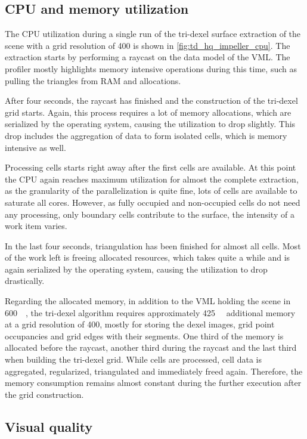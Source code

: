 \subsection{CPU and memory utilization}
\label{sec:tri_dexel_utilization}

The CPU utilization during a single run of the tri-dexel surface extraction of the \impeller scene with a grid resolution of 400 is shown in \cref{fig:td_hq_impeller_cpu}.
The extraction starts by performing a raycast on the data model of the VML.
The profiler mostly highlights memory intensive operations during this time, such as pulling the triangles from RAM and allocations.

After four seconds, the raycast has finished and the construction of the tri-dexel grid starts.
Again, this process requires a lot of memory allocations, which are serialized by the operating system, causing the utilization to drop slightly.
This drop includes the aggregation of data to form isolated cells, which is memory intensive as well.

Processing cells starts right away after the first cells are available.
At this point the CPU again reaches maximum utilization for almost the complete extraction, as the granularity of the parallelization is quite fine, \ie lots of cells are available to saturate all cores.
However, as fully occupied and non-occupied cells do not need any processing, only boundary cells contribute to the surface, the intensity of a work item varies.

In the last four seconds, triangulation has been finished for almost all cells.
Most of the work left is freeing allocated resources, which takes quite a while and is again serialized by the operating system, causing the utilization to drop drastically.

Regarding the allocated memory, in addition to the VML holding the \impeller scene in \SI{600}{\mebi\byte}, the tri-dexel algorithm requires approximately \SI{425}{\mebi\byte} additional memory at a grid resolution of 400, mostly for storing the dexel images, grid point occupancies and grid edges with their segments.
One third of the memory is allocated before the raycast, another third during the raycast and the last third when building the tri-dexel grid.
While cells are processed, cell data is aggregated, regularized, triangulated and immediately freed again.
Therefore, the memory consumption remains almost constant during the further execution after the grid construction.


\subsection{Visual quality}

